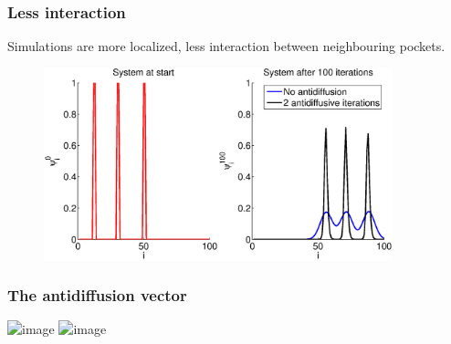 \documentclass[hyperref={pdfstartview=Fit,pdfpagemode=FullScreen}]{beamer}
\newcommand{\imsize}{}
\begin{document}
\begin{frame}

\frametitle{Less interaction}
Simulations are more localized, less interaction between neighbouring pockets.

\begin{figure}
\renewcommand{\imsize}{0.9\textwidth}
\includegraphics[width=\imsize]{animation/peaks}%
\end{figure}
\end{frame}

\begin{frame}
\frametitle{The antidiffusion vector}
\renewcommand{\imsize}{\textwidth}
\includegraphics<1>[width=0.8\imsize]{ad1d}
\includegraphics<2>[width=\imsize]{ad2d}
\end{frame}
\end{document}
